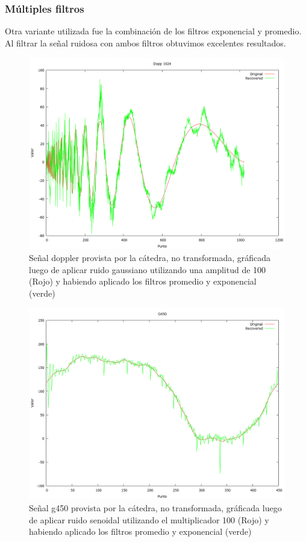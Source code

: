 \subsubsection{M\'ultiples filtros}

Otra variante utilizada fue la combinaci\'on de los filtros exponencial y
promedio. Al filtrar la se\~nal ruidosa con ambos filtros obtuvimos excelentes
resultados.

\begin{figure}
\begin {center}
\includegraphics[width=360pt]{../matlab/dopp1024-gauss100-both.png}
\end {center}
\caption{Se\~nal doppler provista por la c\'atedra, no transformada, gr\'aficada
luego de aplicar ruido gaussiano utilizando una amplitud de 100 (Rojo) y 
habiendo aplicado los filtros promedio y exponencial (verde)}
\label{fig:SinProm}
\end{figure}

\begin{figure}
\begin {center}
\includegraphics[width=360pt]{../matlab/g450-sin100-both.png}
\end {center}
\caption{Se\~nal g450 provista por la c\'atedra, no transformada, gr\'aficada
luego de aplicar ruido senoidal utilizando el multiplicador 100 (Rojo) y 
habiendo aplicado los filtros promedio y exponencial (verde)}
\label{fig:SinProm}
\end{figure}

